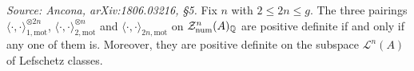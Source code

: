 \begin{proposition}
  \label{prop:scht-lefschetz}
  \textit{Source: Ancona, arXiv:1806.03216, §5.}
  Fix \(n\) with \(2 \le 2n \le g\). The three pairings
  \(\langle \cdot, \cdot \rangle_{1,\mathrm{mot}}^{\otimes 2n}\),
  \(\langle \cdot, \cdot \rangle_{2,\mathrm{mot}}^{\otimes n}\) and
  \(\langle \cdot, \cdot \rangle_{2n,\mathrm{mot}}\) on
  \(\mathcal{Z}^{n}_{\mathrm{num}}(A)_{\mathbb{Q}}\) are positive definite if and only if any one
  of them is. Moreover, they are positive definite on the subspace
  \(\mathcal{L}^{n}(A)\) of Lefschetz classes.
\end{proposition}

